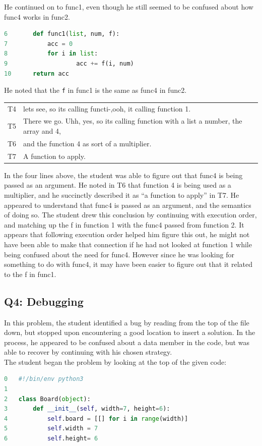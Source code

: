 He continued on to func1, even though he still seemed to be confused about how func4 works in func2.

\begin{lstlisting}[language=python]
6		def func1(list, num, f):
7			acc = 0
8			for i in list:
9					acc += f(i, num)
10		return acc
\end{lstlisting}

He noted that the \texttt{f} in func1 is the same as func4 in func2. \\

\begin{tabular}{lp{13cm}}
T4& lets see, so its calling functi-,ooh, it calling function 1.\\
T5&There we go. Uhh, yes, so its calling function with a list a number, the array and 4,\\
T6&and the function 4 as sort of a multiplier.\\
T7&A function to apply. \\
\end{tabular}

In the four lines above, the student was able to figure out that func4 is being passed as an argument.
He noted in T6 that function 4 is being used as a multiplier, and he succinctly described it as ``a function to apply'' in T7.
He appeared to understand that func4 is passed as an argument, and the semantics of doing so.
The student drew this conclusion by continuing with execution order, and matching up the f in function 1 with the func4 passed from function 2.
It appears that following execution order helped him figure this out, he might not have been able to make that connection if he had not looked at function 1 while being confused about the need for func4.
However since he was looking for something to do with func4, it may have been easier to figure out that it related to the f in func1.

\subsection{Q4: Debugging}
In this problem, the student identified a bug by reading from the top of the file down, but stopped upon encountering a good location to insert a solution. In the process, he appeared to be confused about a data member in the code, but was able to recover by continuing with his chosen strategy. \\

The student began the problem by looking at the top of the given code:
\begin{lstlisting}[language=python]
0 	#!/bin/env python3
1
2 	class Board(object):
3 		def __init__(self, width=7, height=6):
4 			self.board = [[] for i in range(width)]
5 			self.width = 7
6 			self.height= 6
\end{lstlisting}

